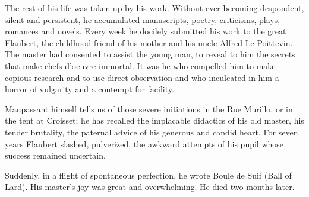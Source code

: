  The rest of his life was taken up by his work. Without ever becoming despondent, silent and persistent, he accumulated manuscripts, poetry, criticisms, plays, romances and novels. Every week he docilely submitted his work to the great Flaubert, the childhood friend of his mother and his uncle Alfred Le Poittevin. The master had consented to assist the young man, to reveal to him the secrets that make chefs-d'oeuvre immortal. It was he who compelled him to make copious research and to use direct observation and who inculcated in him a horror of vulgarity and a contempt for facility.

Maupassant himself tells us of those severe initiations in the Rue Murillo, or in the tent at Croisset; he has recalled the implacable didactics of his old master, his tender brutality, the paternal advice of his generous and candid heart. For seven years Flaubert slashed, pulverized, the awkward attempts of his pupil whose success remained uncertain.

Suddenly, in a flight of spontaneous perfection, he wrote Boule de Suif (Ball of Lard). His master's joy was great and overwhelming. He died two months later. 
